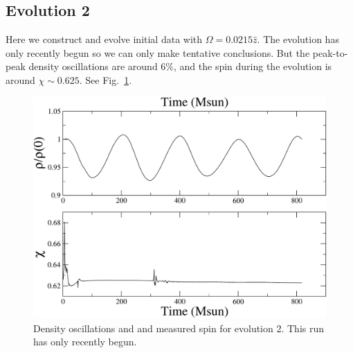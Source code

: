 \subsection{Evolution 2}
Here we construct and evolve initial data with $\Omega=0.0215\hat{z}$. The
evolution has only recently begun so we can only make tentative
conclusions. But the peak-to-peak density oscillations are around
$6\%$, and the spin during the evolution is around $\chi\sim0.625$. See
Fig.~\ref{fig:Ev2Snapshot}.

\begin{figure}[!ht]
\includegraphics[width=0.95\columnwidth]{chap6/Ev2Snapshot}
\caption{\label{fig:Ev2Snapshot} Density oscillations and and measured
  spin for evolution 2. This run has only recently begun.}
\end{figure}

